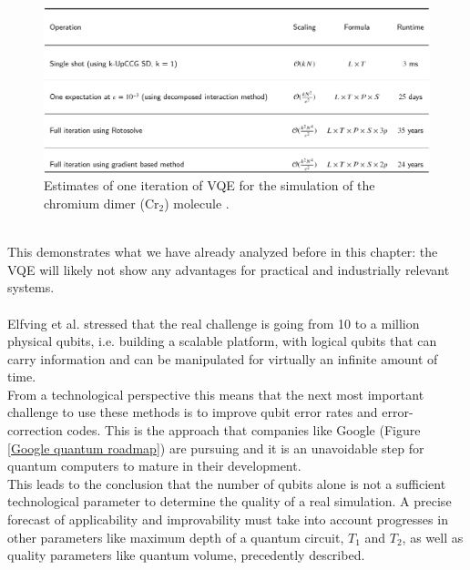 \begin{figure}[ht]
  \centering
  \includegraphics[width=\textwidth]{figures/Chromium dimer VQE.png}
  \caption{Estimates of one iteration of VQE for the simulation of the chromium dimer (Cr$_2$) molecule \cite{Tilly2021Nov}.} \label{Chromium dimer VQE}
\end{figure} \\
This demonstrates what we have already analyzed before in this chapter: the VQE will likely not show any advantages for practical and industrially relevant systems. \\
\\
Elfving et al. \cite{Elfving2020Sep} stressed that the real challenge is going from 10 to a million physical qubits, i.e. building a scalable platform, with logical qubits that can carry information and can be manipulated for virtually an infinite amount of time. \\
From a technological perspective this means that the next most important challenge to use these methods is to improve qubit error rates and error-correction codes. This is the approach that companies like Google (Figure \ref{Google quantum roadmap}) are pursuing and it is an unavoidable step for quantum computers to mature in their development. \\
This leads to the conclusion that the number of qubits alone is not a sufficient technological parameter to determine the quality of a real simulation. A precise forecast of applicability and improvability must take into account progresses in other parameters like maximum depth of a quantum circuit, $T_1$ and $T_2$, as well as quality parameters like quantum volume, precedently described. \\
